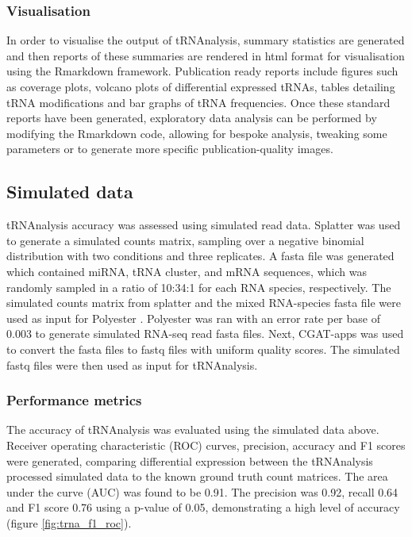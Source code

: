 \subsubsection{Visualisation}
In order to visualise the output of tRNAnalysis, summary statistics are generated and then reports of these summaries are rendered in html format for visualisation using the Rmarkdown framework.
Publication ready reports include figures such as coverage plots, volcano plots of differential expressed tRNAs, tables detailing tRNA modifications and bar graphs of tRNA frequencies.
Once these standard reports have been generated, exploratory data analysis can be performed by modifying the Rmarkdown code, allowing for bespoke analysis, tweaking some parameters or to generate more specific publication-quality images.

\subsection{Simulated data}
tRNAnalysis accuracy was assessed using simulated read data.
Splatter \cite{zappia2017splatter} was used to generate a simulated counts matrix, sampling over a negative binomial distribution with two conditions and three replicates.
A fasta file was generated which contained miRNA, tRNA cluster, and mRNA sequences, which was randomly sampled in a ratio of 10:34:1 for each RNA species, respectively.
The simulated counts matrix from splatter and the mixed RNA-species fasta file were used as input for Polyester \cite{frazee2015polyester}.
Polyester was ran with an error rate per base of 0.003 to generate simulated RNA-seq read fasta files.
Next, CGAT-apps \cite{sims2014cgat} was used to convert the fasta files to fastq files with uniform quality scores.
The simulated fastq files were then used as input for tRNAnalysis.

\subsubsection{Performance metrics}

The accuracy of tRNAnalysis was evaluated using the simulated data above.
Receiver operating characteristic (ROC) curves, precision, accuracy and F1 scores were generated, comparing differential expression between the tRNAnalysis processed simulated data to the known ground truth count matrices.
The area under the curve (AUC) was found to be 0.91.
The precision was 0.92, recall 0.64 and F1 score 0.76 using a p-value of 0.05, demonstrating a high level of accuracy (figure \ref{fig:trna_f1_roc}).

